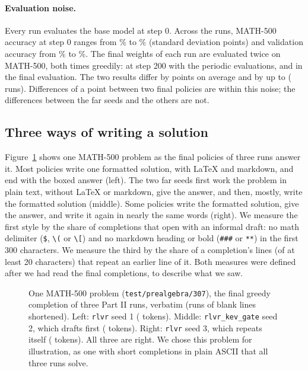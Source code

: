 \paragraph{Evaluation noise.} Every run evaluates the base model at step 0. Across the  runs, MATH-500
accuracy at step 0 ranges from \% to \% (standard deviation
 points) and validation accuracy from \% to \%. The final weights of
each run are evaluated twice on MATH-500, both times greedily: at step 200 with the periodic evaluations, and in the
final evaluation. The two results differ by  points on average and by up to 
( runs). Differences of a point between two final policies are within this noise; the differences
between the far seeds and the others are not.

\subsection{Three ways of writing a solution}\label{sec:res-style}

Figure~\ref{fig:style-example} shows one MATH-500 problem as the final policies of three runs answer it. Most policies
write one formatted solution, with LaTeX and markdown, and end with the boxed answer (left). The two far seeds first
work the problem in plain text, without LaTeX or markdown, give the answer, and then, mostly, write the formatted
solution (middle). Some policies write the formatted solution, give the answer, and write it again in nearly the same words
(right). We measure the first style by the share of completions that open with an informal draft: no math delimiter
(\texttt{\$}, \texttt{\textbackslash(} or \texttt{\textbackslash[}) and no markdown heading or bold (\texttt{\#\#\#} or
\texttt{**}) in the first 300 characters. We measure the third by the share of a completion's lines (of at least 20
characters) that repeat an earlier line of it. Both measures were defined after we had read the final completions, to
describe what we saw.

\begin{figure}[t]
\centering

\caption{One MATH-500 problem (\texttt{test/prealgebra/307}), the final greedy completion of three Part II runs,
verbatim (runs of blank lines shortened). Left: \texttt{rlvr} seed 1 ( tokens). Middle:
\texttt{rlvr\_kev\_gate} seed 2, which drafts first ( tokens). Right: \texttt{rlvr} seed 3,
which repeats itself ( tokens). All three are right. We chose this problem for illustration, as
one with short completions in plain ASCII that all three runs solve.}
\label{fig:style-example}
\end{figure}


